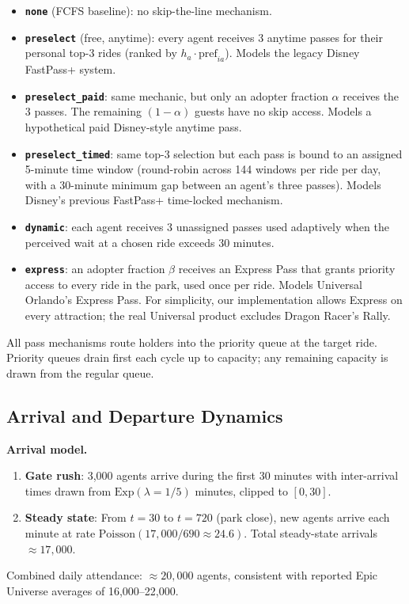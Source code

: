 \documentclass[11pt]{article}
\begin{document}
\begin{itemize}[nosep]
    \item \textbf{\texttt{none}} (FCFS baseline): no skip-the-line mechanism.
    \item \textbf{\texttt{preselect}} (free, anytime): every agent receives 3 anytime passes for their personal top-3 rides (ranked by $h_a \cdot \text{pref}_{ia}$). Models the legacy Disney FastPass+ system.
    \item \textbf{\texttt{preselect\_paid}}: same mechanic, but only an adopter fraction $\alpha$ receives the 3 passes. The remaining $(1 - \alpha)$ guests have no skip access. Models a hypothetical paid Disney-style anytime pass.
    \item \textbf{\texttt{preselect\_timed}}: same top-3 selection but each pass is bound to an assigned 5-minute time window (round-robin across 144 windows per ride per day, with a 30-minute minimum gap between an agent's three passes). Models Disney's previous FastPass+ time-locked mechanism.
    \item \textbf{\texttt{dynamic}}: each agent receives 3 unassigned passes used adaptively when the perceived wait at a chosen ride exceeds 30 minutes.
    \item \textbf{\texttt{express}}: an adopter fraction $\beta$ receives an Express Pass that grants priority access to every ride in the park, used once per ride. Models Universal Orlando's Express Pass. For simplicity, our implementation allows Express on every attraction; the real Universal product excludes Dragon Racer's Rally.
\end{itemize}

All pass mechanisms route holders into the priority queue at the target ride. Priority queues drain first each cycle up to capacity; any remaining capacity is drawn from the regular queue.

\subsection{Arrival and Departure Dynamics}

\textbf{Arrival model.}
\begin{enumerate}[nosep]
    \item \textbf{Gate rush}: 3,000 agents arrive during the first 30 minutes with inter-arrival times drawn from $\text{Exp}(\lambda = 1/5)$ minutes, clipped to $[0, 30]$.
    \item \textbf{Steady state}: From $t = 30$ to $t = 720$ (park close), new agents arrive each minute at rate $\text{Poisson}(17{,}000 / 690 \approx 24.6)$. Total steady-state arrivals $\approx 17{,}000$.
\end{enumerate}
Combined daily attendance: $\approx 20{,}000$ agents, consistent with reported Epic Universe averages of 16,000--22,000.
\end{document}
